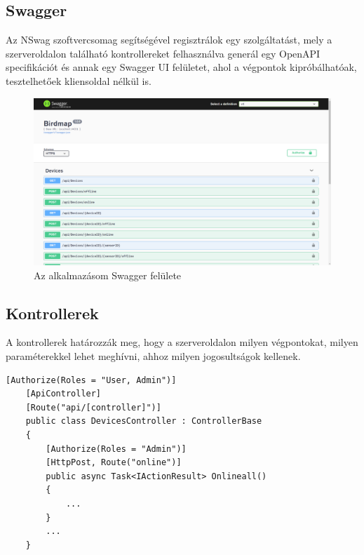 \subsection{Swagger}
\label{subsect:backend-swagger}
Az NSwag \cite{nswag} szoftvercsomag segítségével regisztrálok egy szolgáltatást, 
mely a szerveroldalon található kontrollereket felhasználva generál egy OpenAPI specifikációt és annak egy Swagger UI \cite{swagger-ui} felületet,
ahol a végpontok kipróbálhatóak, tesztelhetőek kliensoldal nélkül is.

\begin{figure}[!ht]
    \centering
    \includegraphics[width=150mm, keepaspectratio]{figures/swagger-ui.png}
    \caption{Az alkalmazásom Swagger felülete}
    \label{fig:swagger-ui}
\end{figure}

\subsection{Kontrollerek}
A kontrollerek határozzák meg, hogy a szerveroldalon milyen végpontokat, milyen paraméterekkel lehet meghívni, ahhoz milyen jogosultságok kellenek.

\begin{lstlisting}[style=csharp, caption=Az eszköz kontroller és annak "online" végpontja, label=lst:devices-controller]
    [Authorize(Roles = "User, Admin")]
    [ApiController]
    [Route("api/[controller]")]
    public class DevicesController : ControllerBase
    {
        [Authorize(Roles = "Admin")]
        [HttpPost, Route("online")]
        public async Task<IActionResult> Onlineall()
        {
            ...
        }
        ...
    }
\end{lstlisting}

